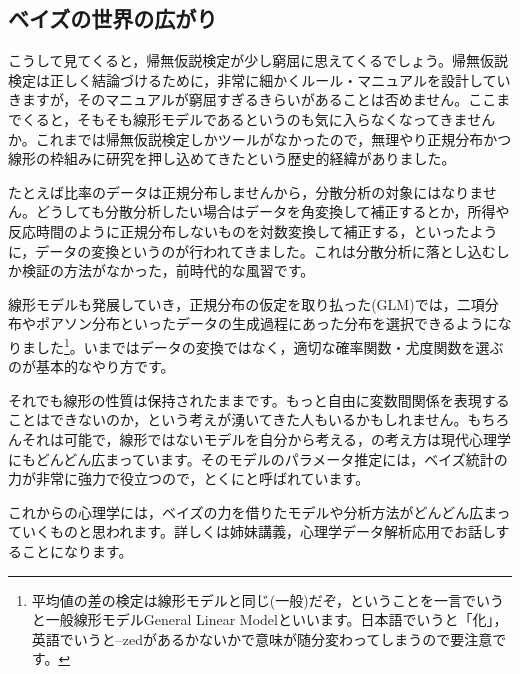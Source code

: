\documentclass{ltjbook}
\begin{document}
\subsection{ベイズの世界の広がり}
こうして見てくると，帰無仮説検定が少し窮屈に思えてくるでしょう。帰無仮説検定は正しく結論づけるために，非常に細かくルール・マニュアルを設計していきますが，そのマニュアルが窮屈すぎるきらいがあることは否めません。ここまでくると，そもそも線形モデルであるというのも気に入らなくなってきませんか。これまでは帰無仮説検定しかツールがなかったので，無理やり正規分布かつ線形の枠組みに研究を押し込めてきたという歴史的経緯がありました。

たとえば比率のデータは正規分布しませんから，分散分析の対象にはなりません。どうしても分散分析したい場合はデータを角変換して補正するとか，所得や反応時間のように正規分布しないものを対数変換して補正する，といったように，データの変換というのが行われてきました。これは分散分析に落とし込むしか検証の方法がなかった，前時代的な風習です。

線形モデルも発展していき，正規分布の仮定を取り払った(GLM)では，二項分布やポアソン分布といったデータの生成過程にあった分布を選択できるようになりました\footnote{平均値の差の検定は線形モデルと同じ(一般)だぞ，ということを一言でいうと一般線形モデルGeneral Linear Modelといいます。日本語でいうと「化」，英語でいうと--zedがあるかないかで意味が随分変わってしまうので要注意です。}。いまではデータの変換ではなく，適切な確率関数・尤度関数を選ぶのが基本的なやり方です。

それでも線形の性質は保持されたままです。もっと自由に変数間関係を表現することはできないのか，という考えが湧いてきた人もいるかもしれません。もちろんそれは可能で，線形ではないモデルを自分から考える，の考え方は現代心理学にもどんどん広まっています。そのモデルのパラメータ推定には，ベイズ統計の力が非常に強力で役立つので，とくにと呼ばれています。

これからの心理学には，ベイズの力を借りたモデルや分析方法がどんどん広まっていくものと思われます。詳しくは姉妹講義，心理学データ解析応用でお話しすることになります。
\end{document}
